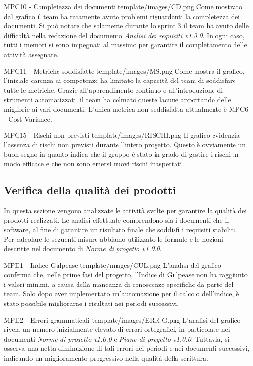 \Met
{ %
    MPC10 - Completezza dei documenti
}
{ %
    template/images/CD.png
}
{ %
    Come mostrato dal grafico il team ha raramente avuto problemi riguardanti la completezza dei documenti.
    Si può notare che solamente durante lo sprint 3 il team ha avuto delle difficoltà nella redazione del documento \textit{Analisi dei requisiti v1.0.0}.
    In ogni caso, tutti i membri si sono impegnati al massimo per garantire il completamento delle attività assegnate.
}

\Met
{ %
    MPC11 - Metriche soddisfatte
}
{ %
    template/images/MS.png
}
{ %
    Come mostra il grafico, l'iniziale carenza di competenze ha limitato la capacità del team di soddisfare tutte le metriche.
    Grazie all'apprendimento continuo e all'introduzione di strumenti automatizzati, il team ha colmato queste lacune apportando delle migliorie ai vari documenti.
    L'unica metrica non soddisfatta attualmente è MPC6 - Cost Variance.
}

\Met
{ %
    MPC15 - Rischi non previsti
}
{ %
    template/images/RISCHI.png
}
{ %
    Il grafico evidenzia l'assenza di rischi non previsti durante l'intero progetto.
    Questo è ovviamente un buon segno in quanto indica che il gruppo è stato in grado 
    di gestire i rischi in modo efficace e che non sono emersi nuovi rischi inaspettati.
}

\subsection{Verifica della qualità dei prodotti}
In questa sezione vengono analizzate le attività svolte per garantire la qualità dei prodotti realizzati.
Le analisi effettuate comprendono sia i documenti che il software, al fine di garantire un risultato finale che soddisfi i requisiti stabiliti.\\
Per calcolare le seguenti misure abbiamo utilizzato le formule e le nozioni descritte nel documento di \textit{Norme di progetto v1.0.0}.

\Met
{ %
    MPD1 - Indice Gulpease
}
{ %
    template/images/GUL.png
}
{ %
    L'analisi del grafico conferma che, nelle prime fasi del progetto, l'Indice di Gulpease non ha raggiunto i 
    valori minimi, a causa della mancanza di conoscenze specifiche da parte del team.
    Solo dopo aver implementato un'automazione per il calcolo dell'indice, è stato possibile 
    migliorarne i risultati nei periodi successivi.
}

\Met
{ %
    MPD2 - Errori grammaticali
}
{ %
    template/images/ERR-G.png
}
{ %
    L'analisi del grafico rivela un numero inizialmente elevato di errori ortografici, 
    in particolare nei documenti \textit{Norme di progetto v1.0.0} e \textit{Piano di progetto v1.0.0}.
    Tuttavia, si osserva una netta diminuzione di tali errori nei periodi e nei 
    documenti successivi, indicando un miglioramento progressivo nella qualità della scrittura.
}



